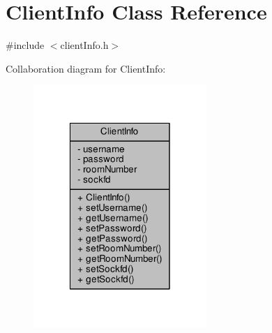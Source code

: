 \hypertarget{class_client_info}{}\section{Client\+Info Class Reference}
\label{class_client_info}


{\ttfamily \#include $<$client\+Info.\+h$>$}



Collaboration diagram for Client\+Info\+:
\nopagebreak
\begin{figure}[H]
\begin{center}
\leavevmode
\includegraphics[width=186pt]{class_client_info__coll__graph}
\end{center}
\end{figure}
